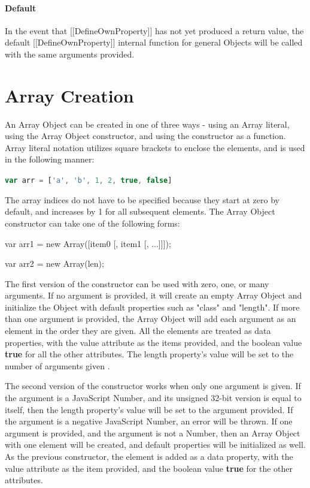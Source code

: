 \documentclass[a4paper,11pt,twoside]{report}
\def\jsinline{\lstinline[language=JavaScript, basicstyle=\small]}%\end{lstlisting}
\begin{document}
\paragraph{Default}
In the event that [[DefineOwnProperty]] has not yet produced a return value, the default [[DefineOwnProperty]] internal function for general Objects will be called with the same arguments provided.

\section{Array Creation}\label{sec:arraycreate}
An Array Object can be created in one of three ways - using an Array literal, using the Array Object constructor, and using the constructor as a function. Array literal notation utilizes square brackets to enclose the elements, and is used in the following manner:
\begin{center}
\jsinline|var arr = ['a', 'b', 1, 2, true, false]|
\end{center}


The array indices do not have to be specified because they start at zero by default, and increases by 1 for all subsequent elements. The Array Object constructor can take one of the following forms:

\begin{adjustwidth}{5cm}{4cm}
\begin{lstjs}
var arr1 = new Array([item0 [, item1 [, ...]]]);

var arr2 = new Array(len);
\end{lstjs}
\end{adjustwidth}

The first version of the constructor can be used with zero, one, or many arguments. If no argument is provided, it will create an empty Array Object and initialize the Object with default properties such as "class" and "length". If more than one argument is provided, the Array Object will add each argument as an element in the order they are given. All the elements are treated as data properties, with the value attribute as the items provided, and the boolean value \textbf{true} for all the other attributes. The length property's value will be set to the number of arguments given \cite{EcmaScript}.

The second version of the constructor works when only one argument is given. If the argument is a JavaScript Number, and its unsigned 32-bit version is equal to itself, then the length property's value will be set to the argument provided. If the argument is a negative JavaScript Number, an error will be thrown. If one argument is provided, and the argument is not a Number, then an Array Object with one element will be created, and default properties will be initialized as well. As the previous constructor, the element is added as a data property, with the value attribute as the item provided, and the boolean value \textbf{true} for the other attributes. 
\end{document}
